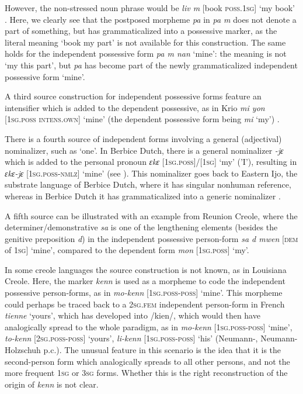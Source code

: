 \documentclass[output=paper]{langsci/langscibook}
\begin{document}
However, the non-stressed noun phrase would be \textit{liv m} [book \textsc{poss.1sg]} `my book' \citep{Fattier2013}. Here, we clearly see that the postposed morpheme \textit{pa} in \textit{pa m} does not denote a part of something, but has grammaticalized into a possessive marker, as the literal meaning `book my part' is not available for this construction. The same holds for the independent possessive form \textit{pa m nan} `mine': the meaning is not `my this part', but \textit{pa} has become part of the newly grammaticalized independent possessive form `mine'. 

A third source construction for independent possessive forms feature an intensifier which is added to the dependent possessive, as in Krio \textit{mi yon} [\textsc{1sg.poss} \textsc{intens.own}] `mine' (the dependent possessive form being \textit{mi} `my') \citep{Finney2013}.

There is a fourth source of independent forms involving a general (adjectival) nominalizer, such as `one'. In Berbice Dutch, there is a general nominalizer \textit{{}-jɛ} which is added to the personal pronoun \textit{ɛkɛ} [\textsc{1sg.poss}]/[1\textsc{sg}] `my' ('I'), resulting in \textit{ɛkɛ-jɛ} [\textsc{1sg.poss-nmlz}] `mine' (see ). This nominalizer goes back to Eastern Ijo, the substrate language of Berbice Dutch, where it has singular nonhuman reference, whereas in Berbice Dutch it has grammaticalized into a generic nominalizer \citep{Kouwenberg2013}.

A fifth source can be illustrated with an example from Reunion Creole, where the  determiner/demonstrative \textit{sa} is one of the lengthening elements (besides the genitive preposition \textit{d}) in the independent possessive person-form \textit{sa d mwen} [\textsc{dem} of \textsc{1sg}] `mine', compared to the dependent form \textit{mon} [\textsc{1sg.poss}] `my'.

In some creole languages the source construction is not known, as in Louisiana Creole. Here, the marker \textit{kenn} is used as a morpheme to code the independent possessive person-forms, as in \textit{mo-kenn} [\textsc{1sg.poss-poss}] `mine'. This morpheme could perhaps be traced back to a \textsc{2sg.fem} independent person-form in French \textit{tienne} `yours', which has developed into /kien/, which would then have analogically spread to the whole paradigm, as in \textit{mo-kenn} [\textsc{1sg.poss-poss}] `mine', \textit{to-kenn} [\textsc{2sg.poss-poss}] `yours', \textit{li-kenn} [\textsc{1sg.poss-poss}] `his' (Neumann-\citealt{HolzschuhKlingler2013}, Neumann-Holzschuh p.c.). The unusual feature in this scenario is the idea that it is the second-person form which analogically spreads to all other persons, and not the more frequent \textsc{1sg} or \textsc{3sg} forms. Whether this is the right reconstruction of the origin of \textit{kenn} is not clear.
\end{document}
